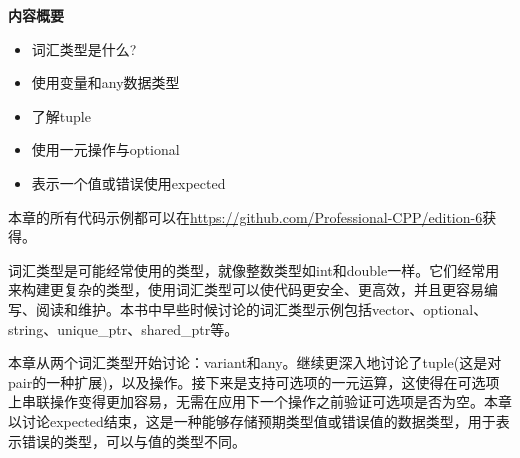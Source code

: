 \noindent
\textbf{内容概要}

\begin{itemize}
\item
词汇类型是什么?

\item
使用变量和any数据类型

\item
了解tuple

\item
使用一元操作与optional

\item
表示一个值或错误使用expected
\end{itemize}

本章的所有代码示例都可以在\url{https://github.com/Professional-CPP/edition-6}获得。

词汇类型是可能经常使用的类型，就像整数类型如int和double一样。它们经常用来构建更复杂的类型，使用词汇类型可以使代码更安全、更高效，并且更容易编写、阅读和维护。本书中早些时候讨论的词汇类型示例包括vector、optional、string、unique\_ptr、shared\_ptr等。

本章从两个词汇类型开始讨论：variant和any。继续更深入地讨论了tuple(这是对pair的一种扩展)，以及操作。接下来是支持可选项的一元运算，这使得在可选项上串联操作变得更加容易，无需在应用下一个操作之前验证可选项是否为空。本章以讨论expected结束，这是一种能够存储预期类型值或错误值的数据类型，用于表示错误的类型，可以与值的类型不同。
